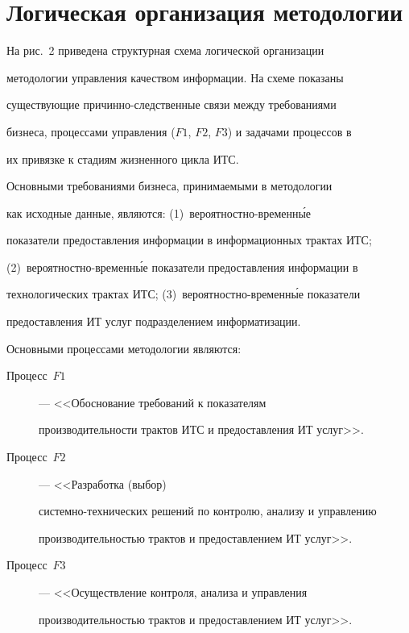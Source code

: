         


        \section{Логическая организация методологии}


        


        На рис.~2 приведена структурная схема логической организации 


методологии управления качеством информации. На схеме показаны 


существующие при\-чин\-но-след\-ст\-вен\-ные связи между требованиями 


бизнеса, процессами управления ($F1$, $F2$, $F3$) и задачами процессов в 


их привязке к стадиям жизненного цикла ИТС. 


        


        Основными требованиями бизнеса, принимаемыми в методологии 


как исходные данные, являются: (1)~вероятностно-временн\'{ы}е 


показатели предоставления информации в информационных трактах ИТС; 


(2)~вероятностно-вре\-мен\-н\'{ы}е показатели предоставления информации в 


технологических трактах ИТС; (3)~вероятностно-временн\'{ы}е показатели 


предоставления ИТ услуг подразделением информатизации.


        


        Основными процессами методологии являются:


\begin{description}


\item[Процесс~$F1$] --- <<Обоснование требований к показателям 


производительности трактов ИТС и предоставления ИТ услуг>>. 


\item[Процесс~$F2$] --- <<Разработка (выбор) 


сис\-тем\-но-тех\-ни\-че\-ских решений по контролю, анализу и управлению 


производительностью трактов и предоставлением ИТ услуг>>.


\item[Процесс~$F3$] --- <<Осуществление контроля, анализа и управления 


производительностью трактов и предоставлением ИТ услуг>>.


\end{description}





